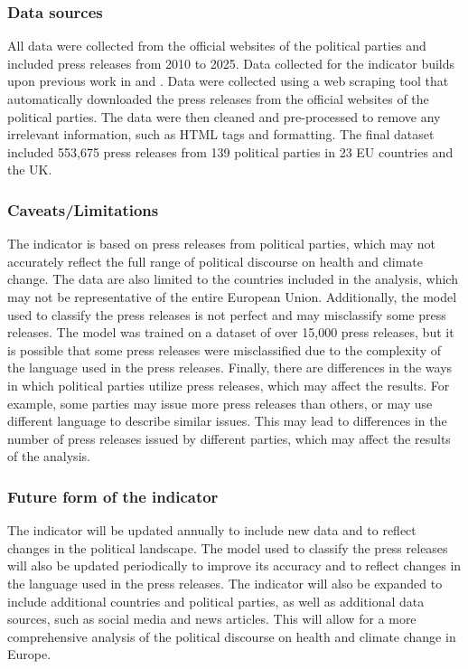 \documentclass[
  letterpaper,
  DIV=11,
  numbers=noendperiod]{scrartcl}
\begin{document}
\subsubsection{Data sources}\label{data-sources}

All data were collected from the official websites of the political
parties and included press releases from 2010 to 2025. Data collected
for the indicator builds upon previous work in
\citet{erfort2023partypress} and \citet{dickson2024going}. Data were
collected using a web scraping tool that automatically downloaded the
press releases from the official websites of the political parties. The
data were then cleaned and pre-processed to remove any irrelevant
information, such as HTML tags and formatting. The final dataset
included 553,675 press releases from 139 political parties in 23 EU
countries and the UK.

\subsubsection{Caveats/Limitations}\label{caveatslimitations}

The indicator is based on press releases from political parties, which
may not accurately reflect the full range of political discourse on
health and climate change. The data are also limited to the countries
included in the analysis, which may not be representative of the entire
European Union. Additionally, the model used to classify the press
releases is not perfect and may misclassify some press releases. The
model was trained on a dataset of over 15,000 press releases, but it is
possible that some press releases were misclassified due to the
complexity of the language used in the press releases. Finally, there
are differences in the ways in which political parties utilize press
releases, which may affect the results. For example, some parties may
issue more press releases than others, or may use different language to
describe similar issues. This may lead to differences in the number of
press releases issued by different parties, which may affect the results
of the analysis.

\subsubsection{Future form of the
indicator}\label{future-form-of-the-indicator}

The indicator will be updated annually to include new data and to
reflect changes in the political landscape. The model used to classify
the press releases will also be updated periodically to improve its
accuracy and to reflect changes in the language used in the press
releases. The indicator will also be expanded to include additional
countries and political parties, as well as additional data sources,
such as social media and news articles. This will allow for a more
comprehensive analysis of the political discourse on health and climate
change in Europe.
\end{document}
